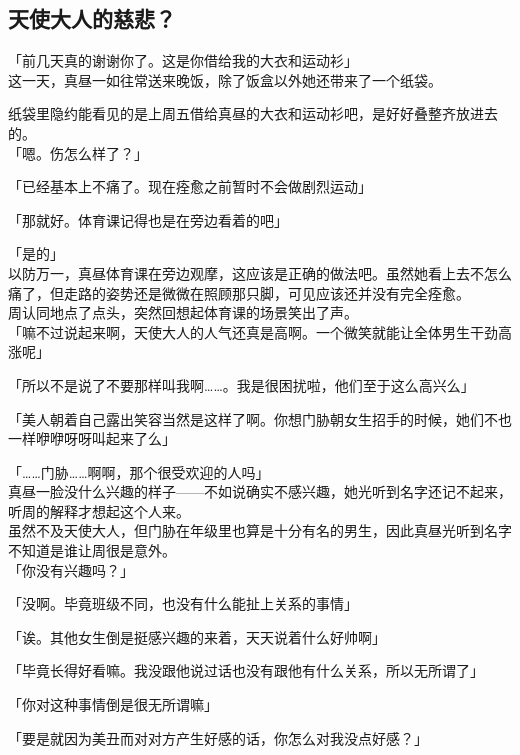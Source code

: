 \subsection{天使大人的慈悲？}

「前几天真的谢谢你了。这是你借给我的大衣和运动衫」\\

这一天，真昼一如往常送来晚饭，除了饭盒以外她还带来了一个纸袋。

纸袋里隐约能看见的是上周五借给真昼的大衣和运动衫吧，是好好叠整齐放进去的。\\

「嗯。伤怎么样了？」

「已经基本上不痛了。现在痊愈之前暂时不会做剧烈运动」

「那就好。体育课记得也是在旁边看着的吧」

「是的」\\

以防万一，真昼体育课在旁边观摩，这应该是正确的做法吧。虽然她看上去不怎么痛了，但走路的姿势还是微微在照顾那只脚，可见应该还并没有完全痊愈。\\

周认同地点了点头，突然回想起体育课的场景笑出了声。\\

「嘛不过说起来啊，天使大人的人气还真是高啊。一个微笑就能让全体男生干劲高涨呢」

「所以不是说了不要那样叫我啊……。我是很困扰啦，他们至于这么高兴么」

「美人朝着自己露出笑容当然是这样了啊。你想门胁朝女生招手的时候，她们不也一样咿咿呀呀叫起来了么」

「……门胁……啊啊，那个很受欢迎的人吗」\\

真昼一脸没什么兴趣的样子——不如说确实不感兴趣，她光听到名字还记不起来，听周的解释才想起这个人来。\\

虽然不及天使大人，但门胁在年级里也算是十分有名的男生，因此真昼光听到名字不知道是谁让周很是意外。\\

「你没有兴趣吗？」

「没啊。毕竟班级不同，也没有什么能扯上关系的事情」

「诶。其他女生倒是挺感兴趣的来着，天天说着什么好帅啊」

「毕竟长得好看嘛。我没跟他说过话也没有跟他有什么关系，所以无所谓了」

「你对这种事情倒是很无所谓嘛」

「要是就因为美丑而对对方产生好感的话，你怎么对我没点好感？」

